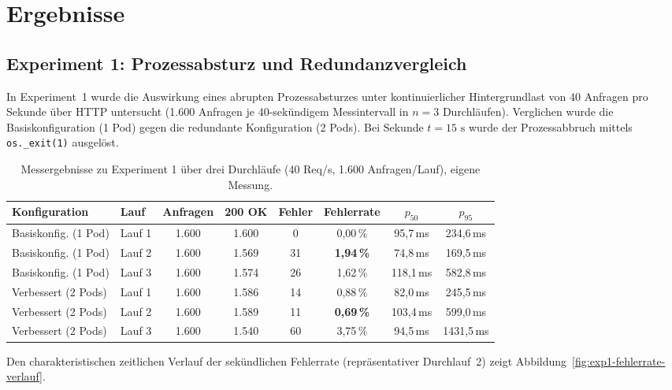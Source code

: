 \chapter{Ergebnisse}
\label{chap:ergebnisse}

\section{Experiment 1: Prozessabsturz und Redundanzvergleich}
\label{sec:ergebnis-exp1}
In Experiment~1 wurde die Auswirkung eines abrupten Prozessabsturzes unter kontinuierlicher Hintergrundlast von 40 Anfragen pro Sekunde über HTTP untersucht (1.600 Anfragen je 40-sekündigem Messintervall in $n=3$ Durchläufen). Verglichen wurde die Basiskonfiguration (1 Pod) gegen die redundante Konfiguration (2 Pods). Bei Sekunde $t = 15\text{ s}$ wurde der Prozessabbruch mittels \texttt{os.\_exit(1)} ausgelöst.

\begin{table}[H]
\centering
\small
\begin{tabular}{llcccccc}
\toprule
\textbf{Konfiguration} & \textbf{Lauf} & \textbf{Anfragen} & \textbf{200 OK} & \textbf{Fehler} & \textbf{Fehlerrate} & \textbf{$p_{50}$} & \textbf{$p_{95}$} \\
\midrule
Basiskonfig. (1 Pod) & Lauf 1 & 1.600 & 1.600 & 0  & 0,00\,\% & 95,7\,ms  & 234,6\,ms \\
Basiskonfig. (1 Pod) & Lauf 2 & 1.600 & 1.569 & 31 & \textbf{1,94\,\%} & 74,8\,ms  & 169,5\,ms \\
Basiskonfig. (1 Pod) & Lauf 3 & 1.600 & 1.574 & 26 & 1,62\,\% & 118,1\,ms & 582,8\,ms \\
\midrule
Verbessert (2 Pods)  & Lauf 1 & 1.600 & 1.586 & 14 & 0,88\,\% & 82,0\,ms  & 245,5\,ms \\
Verbessert (2 Pods)  & Lauf 2 & 1.600 & 1.589 & 11 & \textbf{0,69\,\%} & 103,4\,ms & 599,0\,ms \\
Verbessert (2 Pods)  & Lauf 3 & 1.600 & 1.540 & 60 & 3,75\,\% & 94,5\,ms  & 1431,5\,ms \\
\bottomrule
\end{tabular}
\caption{Messergebnisse zu Experiment 1 über drei Durchläufe (40 Req/s, 1.600 Anfragen/Lauf), eigene Messung.}
\label{tab:messung-exp1}
\end{table}

Den charakteristischen zeitlichen Verlauf der sekündlichen Fehlerrate (repräsentativer Durchlauf~2) zeigt Abbildung~\ref{fig:exp1-fehlerrate-verlauf}.



